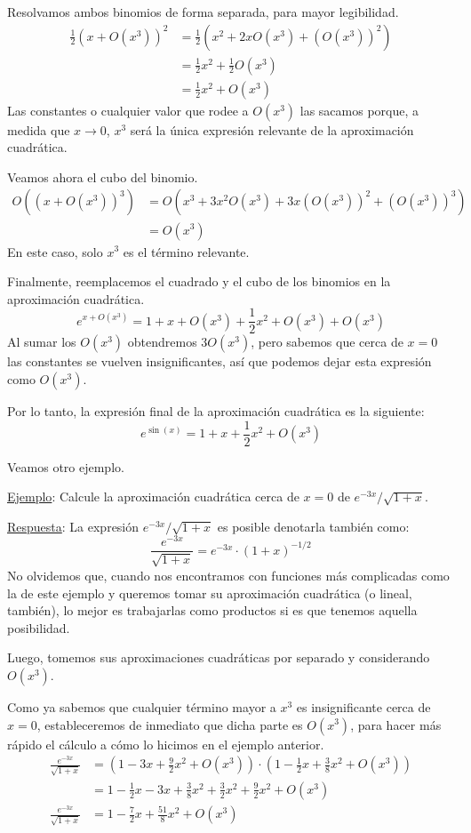 \documentclass[12pt]{article}
\begin{document}
Resolvamos ambos binomios de forma separada, para mayor legibilidad.
\begin{align*}
\frac{1}{2} (x + O(x^{3}))^{2} &=
	\frac{1}{2} (x^{2} + 2xO(x^{3}) + (O(x^{3}))^{2}) \\
 &= \frac{1}{2}x^{2} + \frac{1}{2}O(x^{3}) \\
 & = \frac{1}{2} x^{2} + O(x^{3})
\end{align*}
Las constantes o cualquier valor que rodee a $O(x^{3})$ las sacamos porque, a medida que $x \to 0$, $x^{3}$ será la única expresión relevante de la aproximación cuadrática.

Veamos ahora el cubo del binomio.
\begin{align*}
O\left((x + O(x^{3}))^3\right) &=
	O(x^{3} + 3x^{2}O(x^{3}) + 3x(O(x^{3}))^{2} + (O(x^{3}))^{3}) \\
  &= O(x^{3})
\end{align*}
En este caso, solo $x^{3}$ es el término relevante.

Finalmente, reemplacemos el cuadrado y el cubo de los binomios en la aproximación cuadrática.
\[
e^{x + O(x^{3})} = 1 + x + O(x^{3})
                   + \frac{1}{2} x^{2} + O(x^{3})
                   + O(x^{3})
\]
Al sumar los $O(x^{3})$ obtendremos $3O(x^{3})$, pero sabemos que cerca de $x = 0$ las constantes se vuelven insignificantes, así que podemos dejar esta expresión como $O(x^{3})$.

Por lo tanto, la expresión final de la aproximación cuadrática es la siguiente:
\[e^{\sin(x)} = 1 + x + \frac{1}{2} x^{2} + O(x^{3})\]

\newpage

Veamos otro ejemplo.

\underline{Ejemplo}: Calcule la aproximación cuadrática cerca de $x = 0$ de $e^{-3x}/\sqrt{1 + x}$.

\underline{Respuesta}: La expresión $e^{-3x}/\sqrt{1 + x}$ es posible denotarla también como:
\[\frac{e^{-3x}}{\sqrt{1 + x}} = e^{-3x} \cdot (1 + x)^{-1/2}\]
No olvidemos que, cuando nos encontramos con funciones más complicadas como la de este ejemplo y queremos tomar su aproximación cuadrática (o lineal, también), lo mejor es trabajarlas como productos si es que tenemos aquella posibilidad.

Luego, tomemos sus aproximaciones cuadráticas por separado y considerando $O(x^{3})$.

Como ya sabemos que cualquier término mayor a $x^{3}$ es insignificante cerca de $x = 0$, estableceremos de inmediato que dicha parte es $O(x^{3})$, para hacer más rápido el cálculo a cómo lo hicimos en el ejemplo anterior.
\begin{align*}
\frac{e^{-3x}}{\sqrt{1 + x}} &=
	\left(1 - 3x + \frac{9}{2}x^{2} + O(x^{3})\right) \cdot
	\left(1 - \frac{1}{2}x + \frac{3}{8}x^{2} + O(x^{3})\right) \\
 &= 1 - \frac{1}{2}x - 3x + \frac{3}{8}x^{2} + \frac{3}{2}x^{2}
    + \frac{9}{2}x^{2} + O(x^{3}) \\
\frac{e^{-3x}}{\sqrt{1 + x}} &= 1 - \frac{7}{2}x
                                + \frac{51}{8}x^{2} + O(x^{3})
\end{align*}
\end{document}
